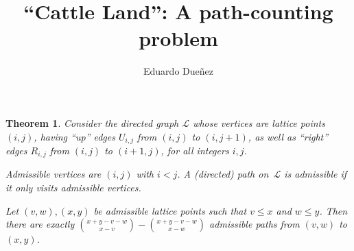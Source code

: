 \documentclass[11pt,letterpaper]{amsart}
\theoremstyle{plain}
\newtheorem*{theorem}{Theorem}
\theoremstyle{definition}
\begin{document}
\title{``Cattle Land'': A path-counting problem}
\author{Eduardo Due\~nez}
\date{}
\maketitle

\begin{theorem}
Consider the directed graph $\mathcal{L}$ whose vertices are lattice points $(i,j)$, having ``\emph{up}'' edges $U_{i,j}$ from $(i,j)$ to $(i,j+1)$, as well as ``\emph{right}'' edges $R_{i,j}$ from $(i,j)$ to $(i+1,j)$, for all integers $i,j$.

\emph{Admissible} vertices are $(i,j)$ with $i<j$.
A (directed) path on~$\mathcal{L}$ is \emph{admissible} if it only visits admissible vertices.

Let $(v,w),(x,y)$ be admissible lattice points such that $v\le x$ and $w\le y$.
Then there are exactly $\binom{x+y-v-w}{x-v} - \binom{x+y-v-w}{x-w}$ admissible paths from $(v,w)$ to $(x,y)$.
\end{theorem}
\end{document}
